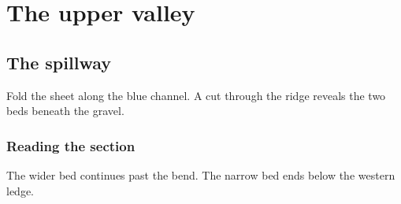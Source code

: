 \documentclass[twoside,openany]{book}
\begin{document}
\part{The upper valley}
\chapter{The spillway}Fold the sheet along the blue channel. A cut through the ridge reveals the two beds beneath the gravel.
\section{Reading the section}The wider bed continues past the bend. The narrow bed ends below the western ledge.
\end{document}
